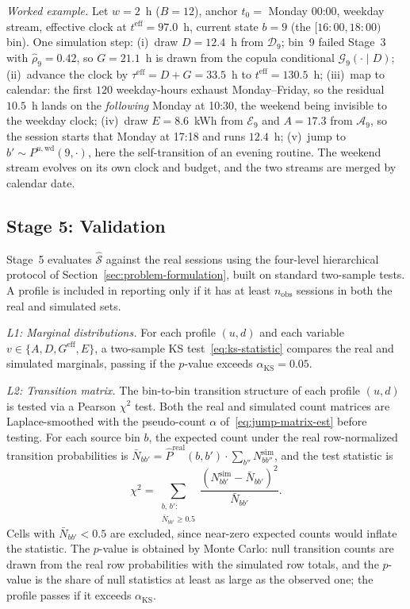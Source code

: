 \documentclass[journal]{IEEEtran}
\begin{document}
\emph{Worked example.} Let $w = 2$~h ($B = 12$), anchor $t_0 = $ Monday 00:00, weekday stream, effective clock at $t^{\mathrm{eff}} = 97.0$~h, current state $b = 9$ (the $[16{:}00, 18{:}00)$ bin). One simulation step: (i)~draw $D = 12.4$~h from $\mathcal{D}_9$; bin~9 failed Stage~3 with $\hat{\rho}_9 = 0.42$, so $G = 21.1$~h is drawn from the copula conditional $\mathcal{G}_9(\cdot \mid D)$; (ii)~advance the clock by $\tau^{\mathrm{eff}} = D + G = 33.5$~h to $t^{\mathrm{eff}} = 130.5$~h; (iii)~map to calendar: the first $120$ weekday-hours exhaust Monday--Friday, so the residual $10.5$~h lands on the \emph{following} Monday at 10:30, the weekend being invisible to the weekday clock; (iv)~draw $E = 8.6$~kWh from $\mathcal{E}_9$ and $A = 17.3$ from $\mathcal{A}_9$, so the session starts that Monday at 17:18 and runs $12.4$~h; (v)~jump to $b' \sim P^{u,\mathrm{wd}}(9, \cdot)$, here the self-transition of an evening routine. The weekend stream evolves on its own clock and budget, and the two streams are merged by calendar date.

\subsection{Stage 5: Validation}
\label{subsec:stage5}

Stage~5 evaluates $\hat{\mathcal{S}}$ against the real sessions using the four-level hierarchical protocol of Section~\ref{sec:problem-formulation}, built on standard two-sample tests. A profile is included in reporting only if it has at least $n_{\mathrm{obs}}$ sessions in both the real and simulated sets.

\emph{L1: Marginal distributions.} For each profile $(u,d)$ and each variable $v \in \{A, D, G^{\mathrm{eff}}, E\}$, a two-sample KS test~\eqref{eq:ks-statistic} compares the real and simulated marginals, passing if the $p$-value exceeds $\alpha_{\mathrm{KS}} = 0.05$.

\emph{L2: Transition matrix.} The bin-to-bin transition structure of each profile $(u,d)$ is tested via a Pearson $\chi^2$ test. Both the real and simulated count matrices are Laplace-smoothed with the pseudo-count $\alpha$ of~\eqref{eq:jump-matrix-est} before testing. For each source bin $b$, the expected count under the real row-normalized transition probabilities is $\bar{N}_{bb'} = \hat{P}^{\mathrm{real}}(b, b') \cdot \sum_{b''} N_{bb''}^{\mathrm{sim}}$, and the test statistic is
\begin{equation}
    \chi^2 = \sum_{\substack{b,\, b':\\ \bar{N}_{bb'} \geq 0.5}}
    \frac{\left(N_{bb'}^{\mathrm{sim}} - \bar{N}_{bb'}\right)^2}
         {\bar{N}_{bb'}}.
    \label{eq:l2-chi2}
\end{equation}
Cells with $\bar{N}_{bb'} < 0.5$ are excluded, since near-zero expected counts would inflate the statistic. The $p$-value is obtained by Monte Carlo: null transition counts are drawn from the real row probabilities with the simulated row totals, and the $p$-value is the share of null statistics at least as large as the observed one; the profile passes if it exceeds $\alpha_{\mathrm{KS}}$.
\end{document}

